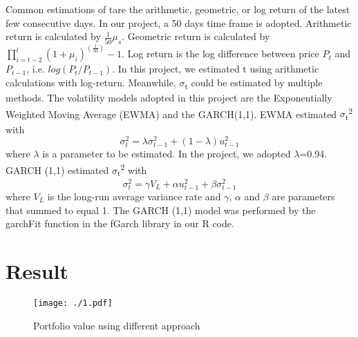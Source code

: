 \documentclass[11pts]{article}
\begin{document}
Common estimations of tare the arithmetic, geometric, or log return of the latest few consecutive days. In our project, a 50 days time frame is adopted. Arithmetic return is calculated by \(\frac{1}{50}\mu_{s}\). Geometric return is calculated by \(\prod_{i=t-2}^{t}(1+\mu_{i})^{(\frac{1}{50})}-1\).
Log return is the log difference between price \(P_t\) and \(P_{t-1}\), i.e. \(log(P_t/P_{t-1})\). In this project, we estimated t using arithmetic calculations with log-return.
Meanwhile, \(\sigma\)\textsubscript{t} could be estimated by multiple methods. The volatility models adopted in this project are the Exponentially Weighted Moving Average (EWMA) and the GARCH(1,1). EWMA estimated \(\sigma\)\textsubscript{t}\textsuperscript{2} with    
\begin{equation}
\sigma_{t}^{2} = \lambda \sigma_{t-1}^{2}+(1-\lambda)u_{t-1}^{2}
\end{equation}
where \(\lambda\) is a parameter to be estimated. In the project, we adopted \(\lambda\)=0.94.
GARCH (1,1) estimated \(\sigma\)\textsubscript{t}\textsuperscript{2} with    
\begin{equation}
\sigma_{t}^{2} = \gamma V_{L}+\alpha u_{t-1}^{2} + \beta \sigma_{t-1}^{2}
\end{equation}
where \(V_{L}\) is the long-run average variance rate and \(\gamma\), \(\alpha\) and \(\beta\) are parameters that summed to equal 1.
The GARCH (1,1) model was performed by the garchFit function in the fGarch library in our R code.
\section{Result}
\label{sec:org578f56d}
\begin{figure}[H]
\centering
\texttt{[image: ./1.pdf]}
\caption[Fig.1]{Portfolio value using different approach}
\end{figure}
\end{document}
